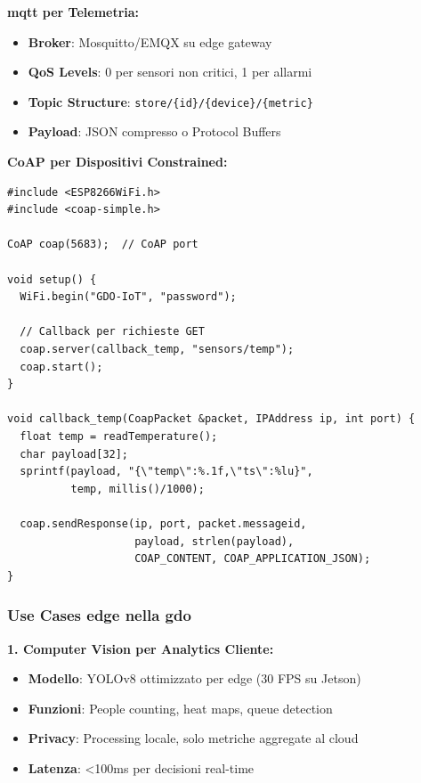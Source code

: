 \textbf{\gls{mqtt} per Telemetria:}
\begin{itemize}
    \item \textbf{Broker}: Mosquitto/EMQX su edge gateway
    \item \textbf{QoS Levels}: 0 per sensori non critici, 1 per allarmi
    \item \textbf{Topic Structure}: \texttt{store/\{id\}/\{device\}/\{metric\}}
    \item \textbf{Payload}: JSON compresso o Protocol Buffers
\end{itemize}

\textbf{CoAP per Dispositivi Constrained:}
\begin{lstlisting}[caption={CoAP Client per Sensore Temperatura},label={lst:coap_sensor}]
#include <ESP8266WiFi.h>
#include <coap-simple.h>

CoAP coap(5683);  // CoAP port

void setup() {
  WiFi.begin("GDO-IoT", "password");
  
  // Callback per richieste GET
  coap.server(callback_temp, "sensors/temp");
  coap.start();
}

void callback_temp(CoapPacket &packet, IPAddress ip, int port) {
  float temp = readTemperature();
  char payload[32];
  sprintf(payload, "{\"temp\":%.1f,\"ts\":%lu}", 
          temp, millis()/1000);
  
  coap.sendResponse(ip, port, packet.messageid, 
                    payload, strlen(payload),
                    COAP_CONTENT, COAP_APPLICATION_JSON);
}
\end{lstlisting}

\subsubsection{\texorpdfstring{Use Cases \gls{edge} nella \gls{gdo}}{3.3.2.4 - Use Cases Edge nella GDO}}

\textbf{1. Computer Vision per Analytics Cliente:}
\begin{itemize}
    \item \textbf{Modello}: YOLOv8 ottimizzato per edge (30 FPS su Jetson)
    \item \textbf{Funzioni}: People counting, heat maps, queue detection
    \item \textbf{Privacy}: Processing locale, solo metriche aggregate al cloud
    \item \textbf{Latenza}: <100ms per decisioni real-time
\end{itemize}


